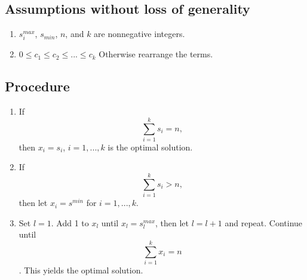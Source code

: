 \documentclass[../mthe-493-final-project.tex]{subfiles}
\begin{document}
    \subsection*{Assumptions without loss of generality}
    \begin{enumerate}
        \item $s_i^{max}$, $s_{min}$, $n$, and $k$ are nonnegative integers.
        \item $0 \leq c_1 \leq c_2 \leq ... \leq c_k$ Otherwise rearrange the terms.
    \end{enumerate}

    \subsection*{Procedure}
    \begin{enumerate}
        \item If \[ \sum_{i=1}^k s_i = n, \] then $x_i = s_i$, $i = 1,...,k$ is the optimal solution.
        \item If \[\sum_{i=1}^k s_i > n,\] then let $x_i = s^{min}$ for $i = 1,...,k$.
        \item Set $l = 1$. Add 1 to $x_l$ until $x_l = s_l^{max}$, then let $l = l+1$ and repeat. Continue until \[ \sum_{i=1}^{k} x_i = n \]. This yields the optimal solution.
    \end{enumerate}
\end{document}
